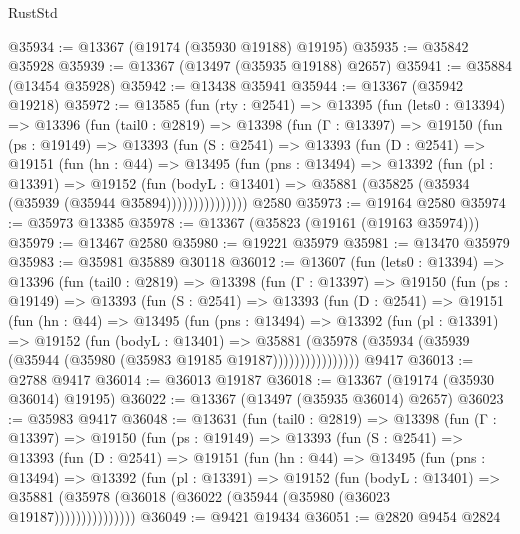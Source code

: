 \begin{lexlean}{RustStd}
\begin{coremodule}
@35934 := @13367 (@19174 (@35930 @19188) @19195)
@35935 := @35842 @35928
@35939 := @13367 (@13497 (@35935 @19188) @2657)
@35941 := @35884 (@13454 @35928)
@35942 := @13438 @35941
@35944 := @13367 (@35942 @19218)
@35972 := @13585
    (fun (rty : @2541) =>
    @13395
      (fun (lets0 : @13394) =>
      @13396
        (fun (tail0 : @2819) =>
        @13398
          (fun (Γ : @13397) =>
          @19150
            (fun (ps : @19149) =>
            @13393
              (fun (S : @2541) =>
              @13393
                (fun (D : @2541) =>
                @19151
                  (fun (hn : @44) =>
                  @13495
                    (fun (pns : @13494) =>
                    @13392
                      (fun (pl : @13391) =>
                      @19152
                        (fun (bodyL : @13401) =>
                        @35881 (@35825 (@35934 (@35939 (@35944 @35894)))))))))))))))
    @2580
@35973 := @19164 @2580
@35974 := @35973 @13385
@35978 := @13367 (@35823 (@19161 (@19163 @35974)))
@35979 := @13467 @2580
@35980 := @19221 @35979
@35981 := @13470 @35979
@35983 := @35981 @35889 @30118
@36012 := @13607
    (fun (lets0 : @13394) =>
    @13396
      (fun (tail0 : @2819) =>
      @13398
        (fun (Γ : @13397) =>
        @19150
          (fun (ps : @19149) =>
          @13393
            (fun (S : @2541) =>
            @13393
              (fun (D : @2541) =>
              @19151
                (fun (hn : @44) =>
                @13495
                  (fun (pns : @13494) =>
                  @13392
                    (fun (pl : @13391) =>
                    @19152
                      (fun (bodyL : @13401) =>
                      @35881
                        (@35978
                          (@35934 (@35939 (@35944 (@35980 (@35983 @19185 @19187))))))))))))))))
    @9417
@36013 := @2788 @9417
@36014 := @36013 @19187
@36018 := @13367 (@19174 (@35930 @36014) @19195)
@36022 := @13367 (@13497 (@35935 @36014) @2657)
@36023 := @35983 @9417
@36048 := @13631
    (fun (tail0 : @2819) =>
    @13398
      (fun (Γ : @13397) =>
      @19150
        (fun (ps : @19149) =>
        @13393
          (fun (S : @2541) =>
          @13393
            (fun (D : @2541) =>
            @19151
              (fun (hn : @44) =>
              @13495
                (fun (pns : @13494) =>
                @13392
                  (fun (pl : @13391) =>
                  @19152
                    (fun (bodyL : @13401) =>
                    @35881 (@35978 (@36018 (@36022 (@35944 (@35980 (@36023 @19187)))))))))))))))
@36049 := @9421 @19434
@36051 := @2820 @9454 @2824

\end{coremodule}
\end{lexlean}
